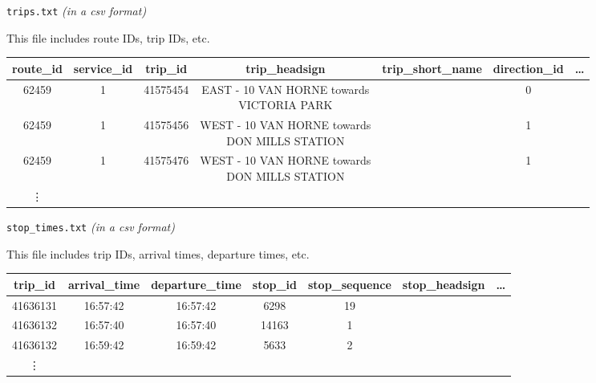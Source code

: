 \documentclass[fontsize=11pt]{article}
\begin{document}
    \noindent \texttt{trips.txt} \emph{(in a csv format)}

    \noindent This file includes route IDs, trip IDs, etc.
    \begin{center}
        \begin{tabular}{| c | c | c | c | c | c | c |}
            \hline
            route\_id & service\_id & trip\_id & trip\_headsign & trip\_short\_name & direction\_id & \ldots \\
            \hline
            62459 & 1 & 41575454 & \makecell{EAST - 10 VAN HORNE towards \\ VICTORIA PARK} & & 0 & \\
            \hline
            62459 & 1 & 41575456 & \makecell{WEST - 10 VAN HORNE towards \\ DON MILLS STATION}    &             & 1          &                \\
            \hline
            62459    & 1             & 41575476          & \makecell{WEST - 10 VAN HORNE towards                \\ DON MILLS STATION}    &             & 1          &                \\
            \hline
            \vdots    &             &          &                &                   &               &        \\
            \hline
        \end{tabular}
    \end{center}

    \noindent \texttt{stop\_times.txt} \emph{(in a csv format)}

    \noindent This file includes trip IDs, arrival times, departure times, etc.
    \begin{center}
        \begin{tabular}{| c | c | c | c | c | c | c |}
            \hline
            trip\_id & arrival\_time & departure\_time & stop\_id & stop\_sequence & stop\_headsign & \ldots \\
            \hline
            41636131 & 16:57:42      & 16:57:42        & 6298     & 19             &                &        \\
            \hline
            41636132 & 16:57:40      & 16:57:40        & 14163    & 1              &                &        \\
            \hline
            41636132 & 16:59:42      & 16:59:42        & 5633     & 2              &                &        \\
            \hline
            \vdots   &               &                 &          &                &                &        \\
            \hline
        \end{tabular}
    \end{center}
\end{document}

